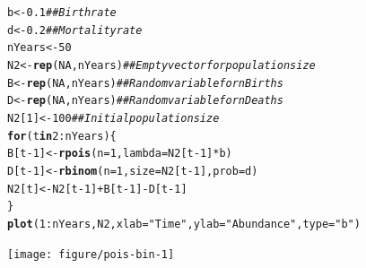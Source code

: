 \documentclass[12pt]{article}\usepackage[]{graphicx}\usepackage[]{color}
\makeatletter
\newcommand{\hlnum}[1]{\textcolor[rgb]{0.686,0.059,0.569}{#1}}%
\newcommand{\hlstr}[1]{\textcolor[rgb]{0.192,0.494,0.8}{#1}}%
\newcommand{\hlcom}[1]{\textcolor[rgb]{0.678,0.584,0.686}{\textit{#1}}}%
\newcommand{\hlopt}[1]{\textcolor[rgb]{0,0,0}{#1}}%
\newcommand{\hlstd}[1]{\textcolor[rgb]{0.345,0.345,0.345}{#1}}%
\newcommand{\hlkwa}[1]{\textcolor[rgb]{0.161,0.373,0.58}{\textbf{#1}}}%
\newcommand{\hlkwb}[1]{\textcolor[rgb]{0.69,0.353,0.396}{#1}}%
\newcommand{\hlkwc}[1]{\textcolor[rgb]{0.333,0.667,0.333}{#1}}%
\newcommand{\hlkwd}[1]{\textcolor[rgb]{0.737,0.353,0.396}{\textbf{#1}}}%
\newenvironment{kframe}{%
 \def\at@end@of@kframe{}%
 \ifinner\ifhmode%
  \def\at@end@of@kframe{\end{minipage}}%
  \begin{minipage}{\columnwidth}%
 \fi\fi%
 \def\FrameCommand##1{\hskip\@totalleftmargin \hskip-\fboxsep
 \colorbox{shadecolor}{##1}\hskip-\fboxsep
     \hskip-\linewidth \hskip-\@totalleftmargin \hskip\columnwidth}%
 \MakeFramed {\advance\hsize-\width
   \@totalleftmargin\z@ \linewidth\hsize
   \@setminipage}}%
 {\par\unskip\endMakeFramed%
 \at@end@of@kframe}
\newenvironment{knitrout}{}{} %
\makeatother
\begin{document}
\begin{knitrout}
\color{fgcolor}\begin{kframe}
\begin{alltt}
\hlstd{b} \hlkwb{<-} \hlnum{0.1}  \hlcom{## Birth rate}
\hlstd{d} \hlkwb{<-} \hlnum{0.2}  \hlcom{## Mortality rate}
\hlstd{nYears} \hlkwb{<-} \hlnum{50}
\hlstd{N2} \hlkwb{<-} \hlkwd{rep}\hlstd{(}\hlnum{NA}\hlstd{, nYears)}  \hlcom{## Empty vector for population size }
\hlstd{B} \hlkwb{<-} \hlkwd{rep}\hlstd{(}\hlnum{NA}\hlstd{, nYears)}   \hlcom{## Random variable for nBirths}
\hlstd{D} \hlkwb{<-} \hlkwd{rep}\hlstd{(}\hlnum{NA}\hlstd{, nYears)}   \hlcom{## Random variable for nDeaths}
\hlstd{N2[}\hlnum{1}\hlstd{]} \hlkwb{<-} \hlnum{100}           \hlcom{## Initial population size}
\hlkwa{for}\hlstd{(t} \hlkwa{in} \hlnum{2}\hlopt{:}\hlstd{nYears) \{}
    \hlstd{B[t}\hlopt{-}\hlnum{1}\hlstd{]} \hlkwb{<-} \hlkwd{rpois}\hlstd{(}\hlkwc{n}\hlstd{=}\hlnum{1}\hlstd{,} \hlkwc{lambda}\hlstd{=N2[t}\hlopt{-}\hlnum{1}\hlstd{]}\hlopt{*}\hlstd{b)}
    \hlstd{D[t}\hlopt{-}\hlnum{1}\hlstd{]} \hlkwb{<-} \hlkwd{rbinom}\hlstd{(}\hlkwc{n}\hlstd{=}\hlnum{1}\hlstd{,} \hlkwc{size}\hlstd{=N2[t}\hlopt{-}\hlnum{1}\hlstd{],} \hlkwc{prob}\hlstd{=d)}
    \hlstd{N2[t]} \hlkwb{<-} \hlstd{N2[t}\hlopt{-}\hlnum{1}\hlstd{]} \hlopt{+} \hlstd{B[t}\hlopt{-}\hlnum{1}\hlstd{]} \hlopt{-} \hlstd{D[t}\hlopt{-}\hlnum{1}\hlstd{]}
\hlstd{\}}
\hlkwd{plot}\hlstd{(}\hlnum{1}\hlopt{:}\hlstd{nYears, N2,} \hlkwc{xlab}\hlstd{=}\hlstr{"Time"}\hlstd{,} \hlkwc{ylab}\hlstd{=}\hlstr{"Abundance"}\hlstd{,} \hlkwc{type}\hlstd{=}\hlstr{"b"}\hlstd{)}
\end{alltt}
\end{kframe}

{\centering \texttt{[image: figure/pois-bin-1]} 

}



\end{knitrout}
\end{document}
